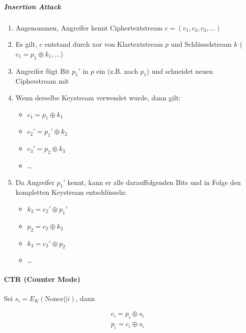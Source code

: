 \subparagraph{Insertion Attack}
\begin{enumerate}
    \item Angenommen, Angreifer kennt Ciphertextstream $c = (c_1, c_2, c_3, \ldots)$ 
    \item Es gilt, $c$ entstand durch xor von Klartextstream $p$ und Schlüsselstream 
    $k$ ($c_1 = p_1 \oplus k_1, \ldots$)
    \item Angreifer fügt Bit $p_1'$ in $p$ ein (z.B. nach $p_1$) und schneidet neuen Cipherstream mit
    \item Wenn derselbe Keystream verwendet wurde, dann gilt:
    \begin{itemize}
        \item $c_1 = p_1 \oplus k_1$
        \item $c_2' = p_1' \oplus k_2$ 
        \item $c_3' = p_2 \oplus k_3$
        \item \ldots
    \end{itemize}
    \item Da Angreifer $p_1'$ kennt, kann er alle darauffolgenden Bits und in Folge den kompletten Keystream
     entschlüsseln:
    \begin{itemize}
        \item $k_2 = c_2' \oplus p_1'$
        \item $p_2 = c_2 \oplus k_2$
        \item $k_3 = c_3' \oplus p_2$
        \item \ldots
    \end{itemize}

\end{enumerate}

\paragraph{CTR (Counter Mode)}

Sei $s_i = E_K(\text{Nonce}||i)$, dann 

\begin{align*}
    c_i = p_i \oplus s_i \\
    p_i = c_i \oplus s_i
\end{align*}

